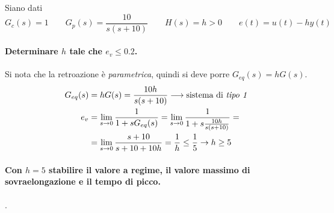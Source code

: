 \begin{esercizio}
Siano dati
\[
	G_c(s) = 1 \qquad G_p(s) = \frac{10}{s(s+10)} \qquad
	H(s) = h > 0 \qquad e(t) = u(t) -hy(t)
\]
\paragraph{Determinare \(h\) tale che \(e_v\leq0.2\).}
Si nota che la retroazione è \emph{parametrica}, quindi si deve porre \(G_{eq}(s)=hG(s)\).
\begin{align*}
	G_{eq}(s) &= hG(s) = \frac{10h}{s(s+10)} \longrightarrow \text{sistema di \emph{tipo 1}} \\
	e_v &= \lim_{s\to0} \frac{1}{1+sG_{eq}(s)} =
		\lim_{s\to0} \frac{1}{1+s\frac{10h}{s(s+10)}} = \\
	    &= \lim_{s\to0} \frac{s+10}{s+10+10h} =
	    	\frac{1}{h} \leq \frac{1}{5}
	    	\rightarrow h \geq 5
\end{align*}

\paragraph{Con \(h=5\) stabilire il valore a regime, il valore massimo di sovraelongazione e il tempo di picco.}
.
\end{esercizio}
